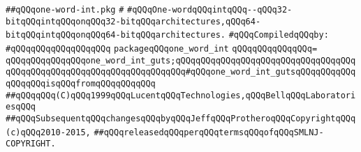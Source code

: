 \label{src/lib/std/one-word-int.pkg}
\verb|##qQQqone-word-int.pkg|\newline
\verb|#|\newline
\verb|#qQQqOne-wordqQQqintqQQq--qQQq32-bitqQQqintqQQqonqQQq32-bitqQQqarchitectures,qQQq64-bitqQQqintqQQqonqQQq64-bitqQQqarchitectures.|\newline
\newline
\verb|#qQQqCompiledqQQqby:|\newline
\verb|#qQQqqQQqqQQqqQQqqQQq|\newline
\newline
\verb|packageqQQqone_word_int|\newline
\verb|qQQqqQQqqQQqqQQq=|\newline
\verb|qQQqqQQqqQQqqQQqone_word_int_guts;qQQqqQQqqQQqqQQqqQQqqQQqqQQqqQQqqQQqqQQqqQQqqQQqqQQqqQQqqQQqqQQqqQQqqQQq#qQQqone_word_int_gutsqQQqqQQqqQQqqQQqqQQqisqQQqfromqQQqqQQqqQQq|\newline
\newline
\newline
\verb|##qQQqqQQq(C)qQQq1999qQQqLucentqQQqTechnologies,qQQqBellqQQqLaboratoriesqQQq|\newline
\verb|##qQQqSubsequentqQQqchangesqQQqbyqQQqJeffqQQqProtheroqQQqCopyrightqQQq(c)qQQq2010-2015,|\newline
\verb|##qQQqreleasedqQQqperqQQqtermsqQQqofqQQqSMLNJ-COPYRIGHT.|\newline

